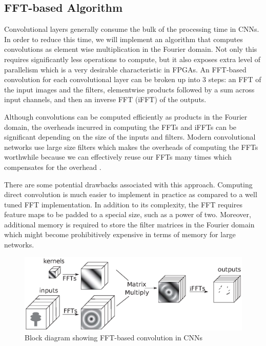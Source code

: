 \documentclass[conference,compsoc]{IEEEtran/IEEEtran}
\begin{document}
\subsection{FFT-based Algorithm}
Convolutional layers generally consume the bulk of the processing time in CNNs. In order to reduce this time, we will implement an algorithm that computes convolutions as element wise multiplication in the Fourier domain. Not only this requires significantly less operations to compute, but it also exposes extra level of parallelism which is a very desirable characteristic in FPGAs. An FFT-based convolution for each convolutional layer can be broken up into $3$ steps: an FFT of the input images and the filters, elementwise products followed by a sum across input channels, and then an inverse FFT (iFFT) of the outputs. 

Although convolutions can be computed efficiently as products in the Fourier domain, the overheads incurred in computing the FFTs and iFFTs can be significant depending on the size of the inputs and filters. Modern convolutional networks use large size filters which makes the overheads of computing the FFTs worthwhile because we can effectively reuse our FFTs many times which compensates for the overhead \cite{FFT1}.

There are some potential drawbacks associated with this approach. Computing direct convolution is much easier to implement in practice as compared to a well tuned FFT implementation. In addition to its complexity, the FFT requires feature maps to be padded to a special size, such as a power of two. Moreover, additional memory is required to store the filter matrices in the Fourier domain which might become prohibitively expensive in terms of memory for large networks.

\begin{figure}[!h]
\begin{center}
\centering
\includegraphics[width=1\columnwidth]{CNN-FFT.eps}
\caption{Block diagram showing FFT-based convolution in CNNs}
\label{syn_lat}
\end{center}
\end{figure}
\end{document}
